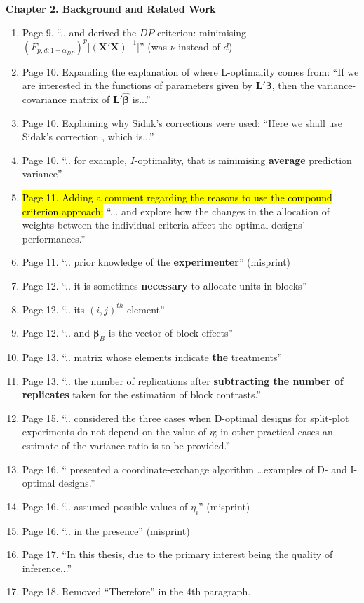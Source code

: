 \documentclass[11pt,a4paper,oneside]{article}
\begin{document}
\textbf{Chapter 2. Background and Related Work}
\begin{enumerate}
\item Page 9. ``.. and derived the $DP$-criterion: minimising $(F_{p,d;1-\alpha_{DP}})^{p}\vert(\bm{X'}\bm{X})^{-1}\vert$'' (was $\nu$ instead of $d$)
\item Page 10. Expanding the explanation of where L-optimality comes from: ``If we are interested in the functions of parameters given by $\bm{L}'\bm{\beta}$, then the variance-covariance matrix of $\bm{L}'\bm{\hat{\beta}}$ is...''
\item Page 10. Explaining why Sidak's corrections were used: ``Here we shall use Sidak's correction \citep{vsidak1967rectangular}, which is...''
\item Page 10. ``.. for example, $I$-optimality, that is minimising \textbf{average} prediction variance''
\item  \hl{Page 11. Adding a comment regarding the reasons to use the compound criterion approach:} ``... and explore how the changes in the allocation of weights between the individual criteria affect the optimal designs' performances.''
\item Page 11. ``.. prior knowledge of the \textbf{experimenter}'' (misprint)
\item Page 12. ``.. it is sometimes \textbf{necessary} to allocate units in blocks''
\item Page 12. ``.. its $(i,j)^{th}$ element''
\item Page 12. ``.. and $\bm{\beta}_B$ is the vector of block effects''
\item Page 13. ``.. matrix whose elements indicate \textbf{the} treatments''
\item Page 13. ``.. the number of replications after \textbf{subtracting the number of replicates} taken for the estimation of block contrasts.''
\item Page 15. ``.. \cite{Goos2001Doptimal} considered the three cases when D-optimal designs for split-plot experiments do not depend on the value of $\eta$; in other practical cases an estimate of the variance ratio is to be provided.'' 
\item Page 16. ``\cite{Arnouts2012staggered} presented a coordinate-exchange algorithm \ldots examples of D- and I-optimal designs.''
\item Page 16. ``.. assumed possible values of $\eta_i$'' (misprint)
\item Page 16. ``.. in the presence'' (misprint)
\item Page 17. ``In this thesis, due to the primary interest being the quality of inference,..''
\item Page 18. Removed ``Therefore'' in the 4th paragraph.
\end{enumerate}
\end{document}
